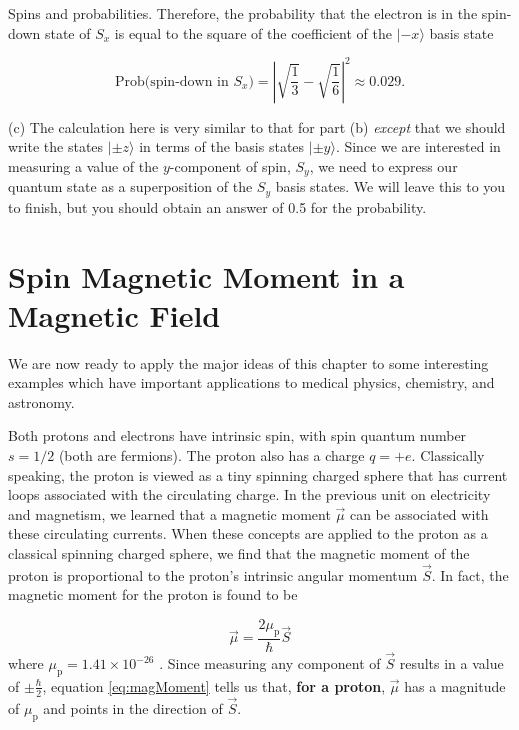 \begin{example}{Spins and probabilities.}
Therefore, the probability that the electron is in the spin-down state of $S_x$ is equal to the square of the coefficient of the $|\mbox{$-x$}\rangle$ basis state

\begin{equation}
\mbox{Prob}\bigl(\mbox{spin-down in $S_x$}\bigr) = \left|\sqrt{\frac{1}{3}} - \sqrt{\frac{1}{6}}\right|^2 \approx 0.029 .
\end{equation} 

(c) The calculation here is very similar to that for part (b) {\em except}
that we should write the states $|\mbox{$\pm z$}\rangle$ in terms of
the basis states $|\mbox{$\pm y$}\rangle$.  Since we are interested
in measuring a value of the $y$-component of spin, $S_y$, we need to
express our quantum state as a superposition of the $S_y$ basis states.
We will leave this to you to finish, but you should obtain an answer of
0.5 for the probability.  
\end{example}

\section{Spin Magnetic Moment in a Magnetic Field}
\label{sec:spin_magnetic_moment}

We are now ready to apply the major ideas of this chapter to
some interesting examples which have important applications to 
medical physics, chemistry, and astronomy.

Both protons and electrons have intrinsic spin, with spin quantum
number $s = 1/2$ (both are fermions).  
The proton also has a charge $q = +e$.
Classically speaking, the proton is viewed as a tiny spinning charged
sphere that has current loops associated with the circulating charge.
In the previous unit on electricity and magnetism, we learned that a
magnetic moment $\vec{\mu}$ can be associated with these circulating
currents.  When these concepts are applied to the proton as a classical
spinning charged sphere, we find that the magnetic moment of the proton
is proportional to the proton's intrinsic angular momentum $\vec{S}$.
In fact, the magnetic moment for the proton is found to be

\begin{equation}
\vec{\mu} = \frac{2 \mu_\text{p}}{\hbar} \vec{S}
\label{eq:magMoment}
\end{equation}
where $\mu_\text{p} = 1.41 \times 10^{-26}$ .  Since measuring any component of $\vec{S}$ results in a value of $\pm \frac{\hbar}{2}$, equation \ref{eq:magMoment} tells us that, {\bf for a proton}, $\vec{\mu}$ has a magnitude of $\mu_\text{p}$ and points in the direction of $\vec{S}$.

